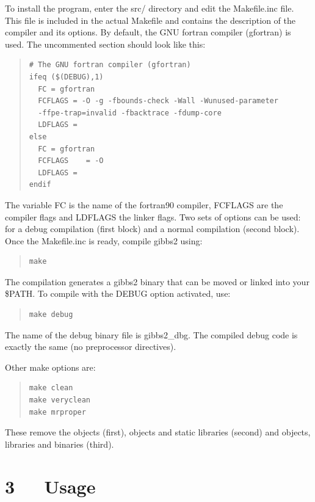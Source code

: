 \documentclass[a4paper]{article}
\begin{document}
To install the program, enter the src/ directory and edit the
Makefile.inc file. This file is included in the actual Makefile and
contains the description of the compiler and its options. By default,
the GNU fortran compiler (gfortran) is used. The uncommented section
should look like this:

\begin{quote}
\begin{verbatim}
# The GNU fortran compiler (gfortran)
ifeq ($(DEBUG),1)
  FC = gfortran
  FCFLAGS = -O -g -fbounds-check -Wall -Wunused-parameter
  -ffpe-trap=invalid -fbacktrace -fdump-core
  LDFLAGS =
else
  FC = gfortran
  FCFLAGS    = -O
  LDFLAGS =
endif
\end{verbatim}
\end{quote}

The variable FC is the name of the fortran90 compiler, FCFLAGS are the
compiler flags and LDFLAGS the linker flags. Two sets of options can
be used: for a debug compilation (first block) and a normal
compilation (second block). Once the Makefile.inc is ready, compile
gibbs2 using:

\begin{quote}
\begin{verbatim}
make
\end{verbatim}
\end{quote}

The compilation generates a gibbs2 binary that can be moved or linked
into your \$PATH. To compile with the DEBUG option activated, use:

\begin{quote}
\begin{verbatim}
make debug
\end{verbatim}
\end{quote}

The name of the debug binary file is gibbs2\_dbg. The compiled debug
code is exactly the same (no preprocessor directives).

Other make options are:

\begin{quote}
\begin{verbatim}
make clean
make veryclean
make mrproper
\end{verbatim}
\end{quote}

These remove the objects (first), objects and static libraries
(second) and objects, libraries and binaries (third).


\section{3   Usage%
  \label{usage}%
}
\end{document}
